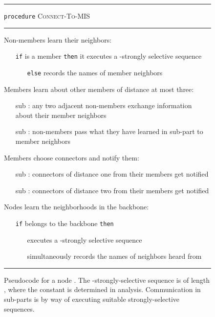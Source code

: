 \documentclass[11pt]{article}
\newcommand{\FF}{\vspace*{\medskipamount}}
\begin{document}
\begin{figure}[t]
\hrule

\FF
 
\texttt{procedure} \textsc{Connect-To-MIS} 

\FF

\hrule

\FF

\begin{description}[nosep]
\item[\sf part :] Non-members learn their neighbors:  
\begin{itemize}[nosep]
\item[]
\texttt{if}  is a member \texttt{then} it executes a -strongly selective sequence
\begin{itemize}[nosep]
\item[]
\texttt{else}  records the names of member neighbors
\end{itemize}
\end{itemize}
\item[\sf part :] Members learn about other members of distance at most three:
\begin{itemize}[nosep]
\item[\sf sub :] any two adjacent non-members exchange information about their member neighbors 
\item[\sf sub :] non-members pass what they have learned in sub-part  to member neighbors
\end{itemize}
\item[\sf part :] Members choose connectors and notify them:
\begin{itemize}[nosep]
\item[\sf sub :] connectors of distance one from their members get notified 
\item[\sf sub :] connectors of distance two from their members get notified
\end{itemize}
\item[\sf part :] Nodes learn the neighborhoods in the backbone:
\begin{itemize}[nosep]
\item[\tt if]  belongs to the backbone \texttt{then} 
\begin{itemize}[nosep]
\item[]
 executes a -strongly selective sequence 
\item[]
 simultaneously records the names of neighbors heard from
\end{itemize}
\end{itemize}
\end{description}

\FF

\hrule

\caption{\label{proc:Connect-To-MIS}
Pseudocode for a node .
The -strongly-selective sequence is of length , where the constant  is determined in analysis.
Communication in sub-parts is by way of executing suitable strongly-selective sequences.}
\end{figure}
\end{document}
